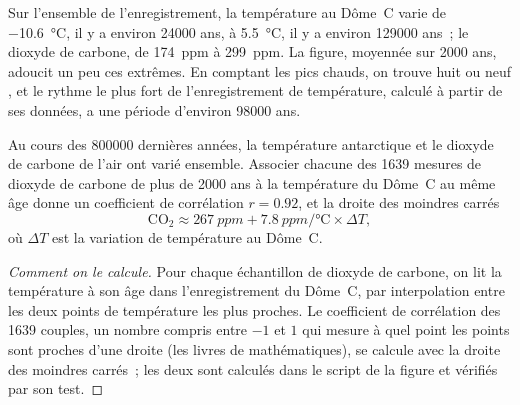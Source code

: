 Sur l'ensemble de l'enregistrement, la température au Dôme~C varie de
\qty{-10.6}{\degreeCelsius}, il y a environ \num{24000} ans, à
\qty{+5.5}{\degreeCelsius}, il y a environ \num{129000} ans~; le dioxyde
de carbone, de \qty{174}{ppm} à \qty{299}{ppm}. La figure, moyennée sur
\num{2000} ans, adoucit un peu ces extrêmes. En comptant les pics chauds,
on trouve huit ou neuf , et le rythme le plus fort de
l'enregistrement de température, calculé à partir de ses données, a une
période d'environ \num{98000} ans.

\begin{proposition}\label{prop:g12:past-climates:correlation}
Au cours des \num{800000} dernières années, la température antarctique et
le dioxyde de carbone de l'air ont varié ensemble. Associer chacune des
1639 mesures de dioxyde de carbone de plus de \num{2000} ans à la
température du Dôme~C au même âge donne un coefficient de corrélation
$r = 0.92$, et la droite des moindres carrés
\[
  \mathrm{CO_2} \approx \qty{267}{ppm} + \qty{7.8}{ppm/\degreeCelsius} \times \Delta T ,
\]
où $\Delta T$ est la variation de température au Dôme~C.
\end{proposition}

\begin{proof}[Comment on le calcule]
Pour chaque échantillon de dioxyde de carbone, on lit la température à son
âge dans l'enregistrement du Dôme~C, par interpolation entre les deux
points de température les plus proches. Le coefficient de corrélation des
1639 couples, un nombre compris entre $-1$ et $1$ qui mesure à quel point
les points sont proches d'une droite (les livres de mathématiques), se
calcule avec la droite des moindres carrés~; les deux sont calculés dans le
script de la figure et vérifiés par son test.
\end{proof}

